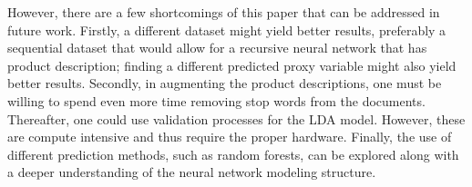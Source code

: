 However, there are a few shortcomings of this paper that can be addressed in future work. Firstly, a different dataset might yield better results, preferably a sequential dataset that would allow for a recursive neural network that has product description; finding a different predicted proxy variable might also yield better results. Secondly, in augmenting the product descriptions, one must be willing to spend even more time removing stop words from the documents. Thereafter, one could use validation processes for the LDA model. However, these are compute intensive and thus require the proper hardware. Finally, the use of different prediction methods, such as random forests, can be explored along with a deeper understanding of the neural network modeling structure. 





